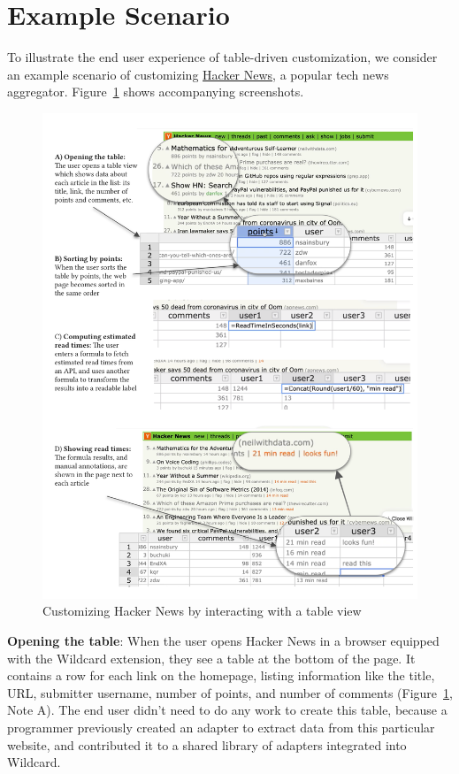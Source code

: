 \documentclass[sigplan,screen,10pt,anonymous,review]{acmart}
\begin{document}
\hypertarget{sec:example}{%
\section{Example Scenario}\label{sec:example}}

To illustrate the end user experience of table-driven customization, we
consider an example scenario of customizing
\href{https://news.ycombinator.com/}{Hacker News}, a popular tech news
aggregator. Figure~\ref{fig:hacker-news} shows accompanying screenshots.

\begin{figure}
\hypertarget{fig:hacker-news}{%
\centering
\includegraphics[width=\textwidth]{media/hacker-news.png}
\caption{Customizing Hacker News by interacting with a table view}\label{fig:hacker-news}
}
\end{figure}

\textbf{Opening the table}: When the user opens Hacker News in a browser
equipped with the Wildcard extension, they see a table at the bottom of
the page. It contains a row for each link on the homepage, listing
information like the title, URL, submitter username, number of points,
and number of comments (Figure~\ref{fig:hacker-news}, Note A). The end
user didn't need to do any work to create this table, because a
programmer previously created an adapter to extract data from this
particular website, and contributed it to a shared library of adapters
integrated into Wildcard.
\end{document}
